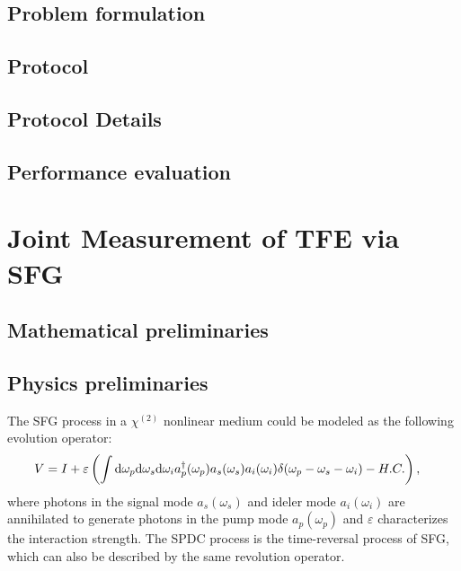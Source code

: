 \documentclass[../../note.tex]{subfiles}
\begin{document}
\subsection{Problem formulation}

\subsection{Protocol}

\subsection{Protocol Details}


\subsection{Performance evaluation}


\section{Joint Measurement of TFE via SFG \cite{liu2020joint}}
\subsection{Mathematical preliminaries}
\begin{proposition}
    
\end{proposition}

\subsection{Physics preliminaries}
\begin{definition}
The SFG process in a $\chi^{(2)}$ nonlinear medium could be modeled as the following evolution operator:
\begin{align}
    \label{evolution operator of sfg process}
    V
    &= I + \varepsilon\left(\int {\rm d}\omega_p {\rm d}\omega_s{\rm d}\omega_i a_p^\dagger(\omega_p)a_s(\omega_s)a_i(\omega_i)\delta(\omega_p - \omega_s - \omega_i) - H.C. \right),
\end{align}
where photons in the signal mode $a_s(\omega_s)$ and ideler mode $a_i(\omega_i)$ are annihilated to generate photons in the pump mode $a_p(\omega_p)$ and $\varepsilon$ characterizes the interaction strength. The SPDC process is the time-reversal process of SFG, which can also be described by the same revolution operator.
\end{definition}
\end{document}
